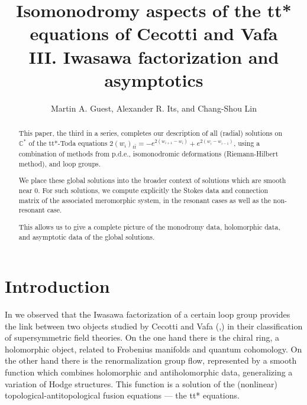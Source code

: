 \documentclass[a4paper,12pt,leqno]{amsart}
\numberwithin{equation}{section}
\theoremstyle{plain}
\theoremstyle{definition}
\newcommand{\C}{\mathbb C}
\newcommand{\ttb}{ {t\bar t}  }
\begin{document}
     

\title[Isomonodromy aspects III: asymptotics]{Isomonodromy aspects of the tt*
equations of Cecotti and Vafa 
\\
III.  Iwasawa factorization and asymptotics
}  

\author{Martin A. Guest, Alexander R. Its, and Chang-Shou Lin}      

\date{}   

\begin{abstract} 
This paper, the third in a series, completes our description of all (radial) solutions on $\C^\ast$ of the tt*-Toda equations
$2(w_i)_{\ttb}=-e^{2(w_{i+1}-w_{i})} + e^{2(w_{i}-w_{i-1})}$, using a combination of methods from p.d.e., isomonodromic deformations (Riemann-Hilbert method), and loop groups.  

We place these global solutions into the broader context of solutions which are smooth near $0$. For such solutions, we compute explicitly the Stokes data and connection matrix of the associated meromorphic system, in the resonant cases as well as the non-resonant case. 

This allows us to give a complete picture of the monodromy data, holomorphic data, and asymptotic data of the global solutions.
\end{abstract}


\maketitle 

\section{Introduction}\label{intro}

In \cite{GuLi14} we observed that the Iwasawa factorization of a certain loop group provides the link between two objects studied by Cecotti and Vafa (\cite{CeVa91},\cite{CeVa92a}) in their classification of supersymmetric field theories.  On the one hand there is the chiral ring, a holomorphic object, related to Frobenius manifolds and quantum cohomology. On the other hand there is the renormalization group flow, represented by a smooth function which combines holomorphic and antiholomorphic data, generalizing a variation of Hodge structures. This function is a solution of the (nonlinear) topological-antitopological fusion equations --- the tt* equations.
\end{document}
